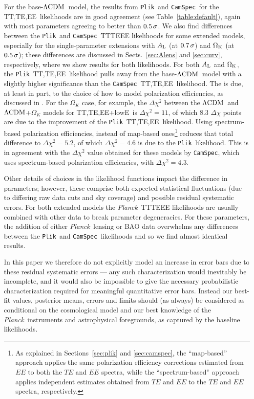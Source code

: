 \documentclass[longauth,traditabstract]{aa}
\def\Planck{\textit{Planck}}
\def\,{\thinspace}
\newcommand{\camspec}{{\tt CamSpec}}
\newcommand{\plik}{{\tt Plik}}
\newcommand{\mksym}[1]{\ifmmode {\rm #1}\else #1\fi}
\newcommand{\dataplus}{\allowbreak+}
\newcommand{\TTTEEE}{\mksym{TT,TE,EE}}
\newcommand{\lowE}{\mksym{lowE}}
\newcommand{\shortall}{\TTTEEE\dataplus\lowE}
\newcommand{\Alens}{A_{\rm L}}
\providecommand{\Omk}{\Omega_K}
\providecommand{\LCDM}{{$\rm{\Lambda CDM}$}}
\newcommand{\likeIII}{\citetalias{planck2016-l05}}
\begin{document}
{For the base-\LCDM\ model, the results from \plik\ and \camspec\ for the \TTTEEE\ likelihoods are in good agreement (see Table~\ref{table:default}), again with most parameters agreeing to better than $0.5\,\sigma$. We also find differences between the \plik\ and \camspec\ TTTEEE likelihoods for some extended models, especially for the single-parameter extensions with $\Alens$ (at $0.7\,\sigma$) and $\Omega_{\rm K}$ (at $0.5\,\sigma$); these differences are discussed in Sects.~\ref{sec:Alens} and \ref{sec:curv}, respectively, where we show results for both likelihoods. For both $\Alens$ and $\Omega_{\rm K}$, the \plik\ \TTTEEE\ likelihood pulls away from the base-\LCDM\ model with a slightly higher significance than the \camspec\ \TTTEEE\ likelihood. The is due, at least in part, to the choice of how to model polarization efficiencies, as discussed in \likeIII. For the $\Omk$ case, for example, the $\Delta \chi^2$ between the \LCDM\ and \LCDM+$\Omk$ models for \shortall\ is $\Delta \chi^2=11$, of which $8.3$ $\Delta\chi$ points are due to the improvement of the \plik\ \TTTEEE\ likelihood. Using spectrum-based polarization efficiencies, instead of map-based ones\footnote{As explained in Sections~\ref{sec:plik} and \ref{sec:camspec}, the ``map-based'' approach applies the same polarization efficiency corrections estimated from $EE$ to both the $TE$ and $EE$ spectra, while the ``spectrum-based'' approach applies  independent estimates obtained from $TE$ and $EE$ to the $TE$ and $EE$ spectra, respectively.} reduces that total difference to $\Delta \chi^2=5.2$, of which $\Delta \chi^2=4.6$ is due to the \plik\ likelihood. This is in agreement with the $\Delta \chi^2$ value obtained for these models by \camspec, which uses spectrum-based polarization efficiencies, with $\Delta \chi^2=4.3$.

Other details of choices in the likelihood functions impact the difference in parameters; however, these comprise both expected statistical fluctuations (due to differing raw data cuts and sky coverage) and possible residual systematic errors. For both extended models the \Planck\ TTTEEE likelihoods are usually combined with other data to break parameter degeneracies. For these parameters, the addition of either \Planck\ lensing or BAO data overwhelms any differences between the \plik\ and \camspec\ likelihoods and so we find almost identical results.

In this paper we therefore do not explicitly model an increase in error bars due to these residual systematic errors --- any such characterization would inevitably be incomplete, and it would also be impossible to give the necessary probabilistic characterization required for meaningful quantitative error bars. Instead our best-fit values, posterior means, errors and limits should (as always) be considered as conditional on the cosmological model and our best knowledge of the \Planck\ instruments and astrophysical foregrounds, as captured by the baseline likelihoods.
}
\end{document}
